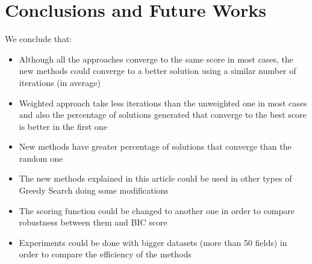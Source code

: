 \section{Conclusions and Future Works}
\label{sec:conclusions}

We conclude that:
\begin{itemize}
	\item Although all the approaches converge to the same score in most cases, the new methods could converge to a better solution using a similar number of iterations (in average)
	\item Weighted approach take less iterations than the unweighted one in most cases and also the percentage of solutions generated that converge to the best score is better in the first one
	\item New methods have greater percentage of solutions that converge than the random one
	\item The new methods explained in this article could be used in other types of Greedy Search doing some modifications
	\item The scoring function could be changed to another one in order to compare robustness between them and BIC score
	\item Experiments could be done with bigger datasets (more than 50 fields) in order to compare the efficiency of the methods
\end{itemize}